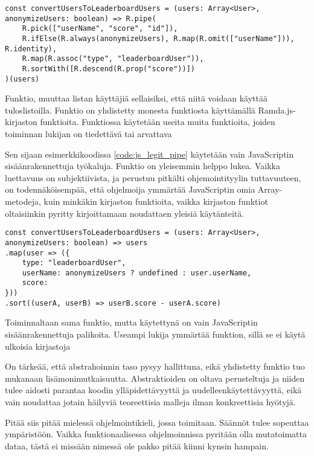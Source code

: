 \begin{code}
    \begin{verbatim}
const convertUsersToLeaderboardUsers = (users: Array<User>, anonymizeUsers: boolean) => R.pipe(
    R.pick(["userName", "score", "id"]),
    R.ifElse(R.always(anonymizeUsers), R.map(R.omit(["userName"])), R.identity),
    R.map(R.assoc("type", "leaderboardUser")),
    R.sortWith([R.descend(R.prop("score"))])
)(users)
\end{verbatim}
    \caption{Funktio, muuttaa listan käyttäjiä sellaisiksi, että niitä voidaan käyttää tuloslistoilla. Funktio on yhdistetty monesta funktiosta käyttämällä Ramda.js-kirjaston funktioita. Funktiossa käytetään useita muita funktioita, joiden toiminnan lukijan on tiedettävä tai arvattava}
    \label{code:js_garbage_pipe}
\end{code}

Sen sijaan esimerkkikoodissa \ref{code:js_legit_pipe} käytetään vain JavaScriptin sisäänrakennettuja työkaluja. Funktio on yleisemmin helppo lukea. Vaikka luettavuus on subjektiivista, ja perustuu pitkälti ohjemointityylin tuttavuuteen, on todennäköisempää, että ohjelmoija ymmärtää JavaScriptin omia Array-metodeja, kuin minkäkin kirjaston funktioita, vaikka kirjaston funktiot oltaisiinkin pyritty kirjoittamaan noudattaen yleisiä käytänteitä.

\begin{code}
    \begin{verbatim}
const convertUsersToLeaderboardUsers = (users: Array<User>, anonymizeUsers: boolean) => users
.map(user => ({
    type: "leaderboardUser",
    userName: anonymizeUsers ? undefined : user.userName,
    score: 
}))
.sort((userA, userB) => userB.score - userA.score)
    \end{verbatim}
    \caption{Toiminnaltaan sama funktio, mutta käytettynä on vain JavaScriptin sisäänrakennettuja palikoita. Useampi lukija ymmärtää funktion, sillä se ei käytä ulkoisia kirjastoja}
    \label{code:js_legit_pipe}
\end{code}


On tärkeää, että abstrahoinnin taso pysyy hallittuna, eikä yhdistetty funktio tuo mukanaan lisämonimutkaisuutta. Abstraktioiden on oltava perusteltuja ja niiden tulee aidosti parantaa koodin ylläpidettävyyttä ja uudelleenkäytettävyyttä, eikä vain noudattaa jotain häilyviä teoreettisia malleja ilman konkreettisia hyötyjä.


Pitää siis pitää mielessä ohjelmointikieli, jossa toimitaan. Säännöt tulee sopeuttaa ympäristöön. Vaikka funktionaalisessa ohjelmoinnissa pyritään olla mutatoimatta dataa, tästä ei missään nimessä ole pakko pitää kiinni kynsin hampain.




